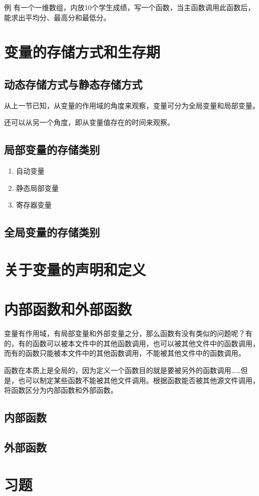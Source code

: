 例 有一个一维数组，内放10个学生成绩，写一个函数，当主函数调用此函数后，能求出平均分、最高分和最低分。
\section{变量的存储方式和生存期}
\subsection{动态存储方式与静态存储方式}
从上一节已知，从变量的作用域的角度来观察，变量可分为全局变量和局部变量。

还可以从另一个角度，即从变量值存在的时间来观察。
\subsection{局部变量的存储类别}
\begin{enumerate}
	\item 自动变量
	\item 静态局部变量
	\item 寄存器变量
\end{enumerate}
\subsection{全局变量的存储类别}
\section{关于变量的声明和定义}
\section{内部函数和外部函数}
变量有作用域，有局部变量和外部变量之分，那么函数有没有类似的问题呢？有的，有的函数可以被本文件中的其他函数调用，也可以被其他文件中的函数调用，而有的函数只能被本文件中的其他函数调用，不能被其他文件中的函数调用。

函数在本质上是全局的，因为定义一个函数目的就是要被另外的函数调用……但是，也可以制定某些函数不能被其他文件调用。根据函数能否被其他源文件调用，将函数区分为内部函数和外部函数。
\subsection{内部函数}
\subsection{外部函数}
\section{习题}
